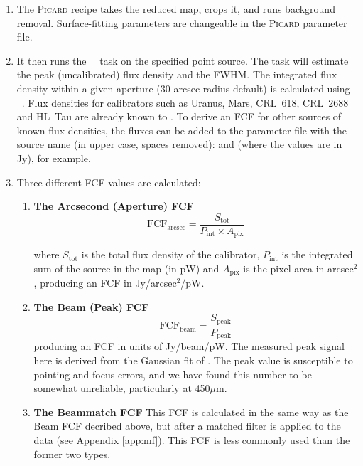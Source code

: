 \begin{enumerate}
\item The \textsc{Picard} recipe  takes the
  reduced map, crops it, and runs background removal. Surface-fitting
  parameters are changeable in the \textsc{Picard} parameter file.

\item It then runs the \Kappa\ \beamfit\ task on the specified point
  source. The  task will estimate the peak
  (uncalibrated) flux density and the FWHM. The integrated flux
  density within a given aperture (30-arcsec radius default) is
  calculated using \photom\ \autophotom. Flux densities for
  calibrators such as Uranus, Mars, CRL~618, CRL~2688 and HL~Tau are
  already known to \picard. To derive an FCF for other sources of
  known flux densities, the fluxes can be added to the parameter file
  with the source name (in upper case, spaces
  removed): 
  and  (where the values are in Jy),
  for example.

\item Three different FCF values are calculated:

  \begin{enumerate}

  \item \textbf{The Arcsecond (Aperture) FCF}
    \begin{equation}
      \label{eq:fcf_arcsec}
      \mathrm{FCF_{arcsec}} = \frac{S_{\mathrm{tot}}}{P_{\mathrm{int}} \times
        A_{\mathrm{pix}}}
    \end{equation}

    where $S_{\mathrm{tot}}$ is the total flux density of the
    calibrator, $P_{\mathrm{int}}$ is the integrated sum of the source
    in the map (in pW) and $A_{\mathrm{pix}}$ is the pixel area in
    arcsec$^2$, producing an FCF in Jy/arcsec$^2$/pW.

   \vspace{3mm}

  \item\textbf{The Beam (Peak) FCF}
    \begin{equation}
      \label{eq:fcf_beam}
      \mathrm{FCF_{beam}} = \frac{S_{\mathrm{peak}}}{P_{\mathrm{peak}}}
    \end{equation}
    producing an FCF in units of Jy/beam/pW. The measured peak signal here is 
    derived from the Gaussian fit of . The peak value is susceptible 
    to pointing and focus errors, and we have found this number to be somewhat unreliable,
    particularly at 450$\mu$m.
    
   \vspace{3mm}

  \item\textbf{The Beammatch FCF}
    This FCF is calculated in the same way as the Beam FCF decribed
    above, but after a matched filter is applied to the data (see Appendix \ref{app:mf}).
    This FCF is less commonly used than the former two types.

  \end{enumerate}

\end{enumerate}


